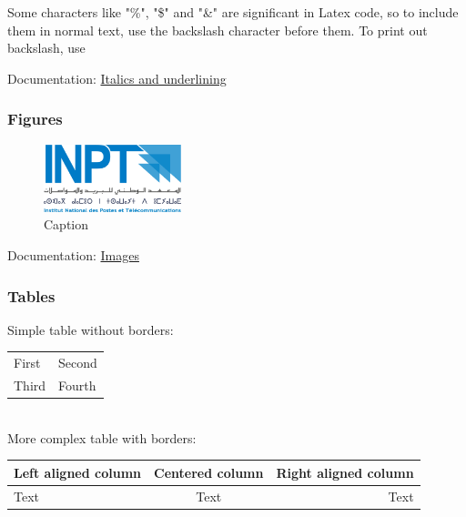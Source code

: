 Some characters like "\%", "\$" and "\&" are significant in Latex code, so to include them in normal text, use the backslash character before them.
To print out backslash, use 


Documentation: \href{https://www.overleaf.com/learn/latex/Bold%2C_italics_and_underlining}{Italics and underlining}


\subsubsection{Figures} 

\begin{figure}[H] 
    \centering
    \includegraphics[width=4cm]{Logos/Logo_INPT.png}
    \caption{Caption}
    \label{fig:my_label} %
\end{figure}



Documentation: \href{https://www.overleaf.com/learn/latex/Inserting_Images}{Images}


\subsubsection{Tables} 

Simple table without borders:
\\

\begin{tabular}{ll}
  First & Second \\
  Third & Fourth
\end{tabular}
\\

More complex table with borders:
\\

\begin{tabular}{|l|c|r|} \hline
  Left aligned column & Centered column & Right aligned column \\ \hline
  Text & Text & Text \\ \hline
\end{tabular}
\\

